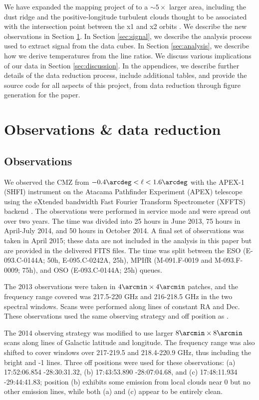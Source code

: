 We have expanded the \formaldehyde mapping project of \citet{Ao2013a} to a
$\sim5\times$ larger area, including the dust ridge and the positive-longitude
turbulent clouds thought to be associated with the intersection point between
the x1 and x2 orbits \citep{Rodriguez-Fernandez2006b, Riquelme2013a}.  We
describe the new
observations in Section \ref{sec:observations}.  In Section \ref{sec:signal},
we describe the analysis process used to extract signal from the data cubes.
In Section \ref{sec:analysis}, we describe how we 
derive temperatures from the line ratios.
We discuss various implications of our data in Section
\ref{sec:discussion}.  In the appendices, we describe further details of the
data reduction process, include additional tables, and provide the source code
for all aspects of this project, from data reduction through figure generation
for the paper.


\section{Observations \& data reduction}
\label{sec:observations}

\subsection{Observations}
We observed the CMZ from $-0.4\arcdeg < \ell < 1.6\arcdeg$
with the APEX-1 (SHFI) instrument \citep{Vassilev2008a} on the Atacama Pathfinder
Experiment (APEX) telescope \citep{Gusten2006b} using the eXtended bandwidth
Fast Fourier Transform
Spectrometer (XFFTS) backend \citep{Klein2012a}.  The observations were
performed in service mode and were spread out over two years.  The time was
divided into 25 hours in June
2013, 75 hours in April-July 2014, and 50 hours in October 2014.  A final
set of observations was taken in April 2015; these data are not included in the
analysis in this paper but are provided in the delivered FITS files.  The
time was split between the ESO (E-093.C-0144A; 50h, E-095.C-0242A, 25h), MPIfR
(M-091.F-0019 and M-093.F-0009; 75h), and OSO (E-093.C-0144A; 25h) queues.

The 2013 observations were taken in $4\arcmin \times 4\arcmin$ patches, and the
frequency range covered was 217.5-220 GHz and 216-218.5 GHz in the two spectral
windows. Scans were performed along lines of constant RA and Dec.  These
observations used the same observing strategy and off position as
\citet{Ao2013a}.

The 2014 observing strategy was modified to use larger $8\arcmin \times
8\arcmin$ scans along lines of Galactic latitude and longitude.  The frequency
range was also shifted to cover windows over 217-219.5 and 218.4-220.9 GHz, thus
including the bright \thirteenco and -1 lines.
Three off positions were used for these observations: (a) 17:52:06.854
-28:30:31.32, (b) 17:43:53.890 -28:07:04.68, and (c) 17:48:11.934 -29:44:41.83;
position (b) exhibits some \thirteenco emission from local clouds near 0 \kms
but no other emission lines, while both (a) and (c) appear to be entirely
clean.

